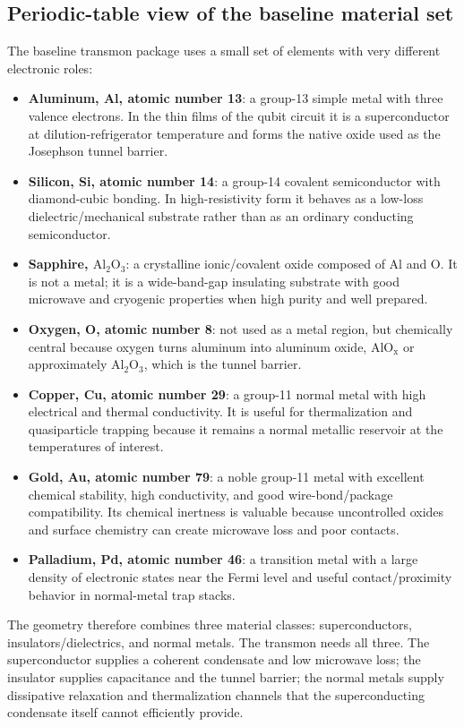 \documentclass[11pt]{article}
\begin{document}
\subsection{Periodic-table view of the baseline material set}
The baseline transmon package uses a small set of elements with very different electronic roles:
\begin{itemize}[leftmargin=1.5em]
    \item \textbf{Aluminum, Al, atomic number 13}: a group-13 simple metal with three valence electrons. In the thin films of the qubit circuit it is a superconductor at dilution-refrigerator temperature and forms the native oxide used as the Josephson tunnel barrier.
    \item \textbf{Silicon, Si, atomic number 14}: a group-14 covalent semiconductor with diamond-cubic bonding. In high-resistivity form it behaves as a low-loss dielectric/mechanical substrate rather than as an ordinary conducting semiconductor.
    \item \textbf{Sapphire, $\mathrm{Al_2O_3}$}: a crystalline ionic/covalent oxide composed of Al and O. It is not a metal; it is a wide-band-gap insulating substrate with good microwave and cryogenic properties when high purity and well prepared.
    \item \textbf{Oxygen, O, atomic number 8}: not used as a metal region, but chemically central because oxygen turns aluminum into aluminum oxide, $\mathrm{AlO_x}$ or approximately $\mathrm{Al_2O_3}$, which is the tunnel barrier.
    \item \textbf{Copper, Cu, atomic number 29}: a group-11 normal metal with high electrical and thermal conductivity. It is useful for thermalization and quasiparticle trapping because it remains a normal metallic reservoir at the temperatures of interest.
    \item \textbf{Gold, Au, atomic number 79}: a noble group-11 metal with excellent chemical stability, high conductivity, and good wire-bond/package compatibility. Its chemical inertness is valuable because uncontrolled oxides and surface chemistry can create microwave loss and poor contacts.
    \item \textbf{Palladium, Pd, atomic number 46}: a transition metal with a large density of electronic states near the Fermi level and useful contact/proximity behavior in normal-metal trap stacks.
\end{itemize}
The geometry therefore combines three material classes: superconductors, insulators/dielectrics, and normal metals. The transmon needs all three. The superconductor supplies a coherent condensate and low microwave loss; the insulator supplies capacitance and the tunnel barrier; the normal metals supply dissipative relaxation and thermalization channels that the superconducting condensate itself cannot efficiently provide.
\end{document}
